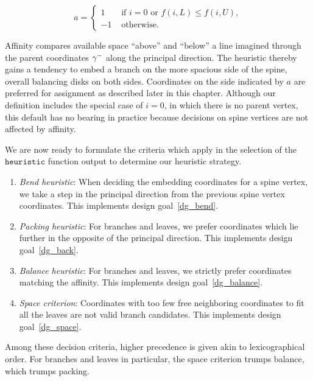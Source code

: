 \begin{equation*}
a = \begin{cases}1 & \text{ if } i = 0 \text{ or } f(i, L) \leq f(i, U), \\
-1 & \text{ otherwise.}
\end{cases}
\end{equation*}

Affinity compares available space ``above'' and ``below'' a line imagined through the parent coordinates $\gamma^-$ along the principal direction. The heuristic thereby gains a tendency to embed a branch on the more spacious side of the spine, overall balancing disks on both sides. Coordinates on the side indicated by $a$ are preferred for assignment as described later in this chapter.
Although our definition includes the special case of $i=0$, in which there is no parent vertex, this default has no bearing in practice because decisions on spine vertices are not affected by affinity.

We are now ready to formulate the criteria which apply in the selection of the $\texttt{heuristic}$ function output to determine our heuristic strategy.

\begin{enumerate}
    \item \emph{Bend heuristic}: When deciding the embedding coordinates for a spine vertex, we take a step in the principal direction from the previous spine vertex coordinates. This implements design goal~\ref{dg_bend}.
    \item \emph{Packing heuristic}: For branches and leaves, we prefer coordinates which lie further in the opposite of the principal direction. This implements design goal~\ref{dg_back}.
    \item \emph{Balance heuristic}: For branches and leaves, we strictly prefer coordinates matching the affinity. This implements design goal~\ref{dg_balance}.
    \item \emph{Space criterion}: Coordinates with too few free neighboring coordinates to fit all the leaves are not valid branch candidates. This implements design goal~\ref{dg_space}.
\end{enumerate}

Among these decision criteria, higher precedence is given akin to lexicographical order. For branches and leaves in particular, the space criterion trumps balance, which trumps packing.

